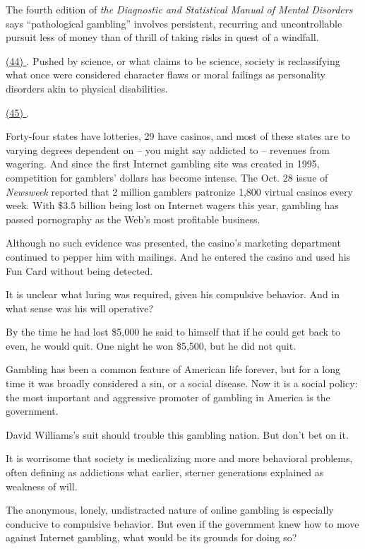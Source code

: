 \qquad The fourth edition of \emph{the Diagnostic and Statistical Manual of Mental Disorders} says ``pathological gambling'' involves persistent, recurring and uncontrollable pursuit less of money than of thrill of taking risks in quest of a windfall.

\qquad \ul{(44) \qquad\qquad}. Pushed by science, or what claims to be science, society is reclassifying what once were considered character flaws or moral failings as personality disorders akin to physical disabilities.

\qquad \ul{(45) \qquad\qquad}.

\qquad Forty-four states have lotteries, 29 have casinos, and most of these states are to varying degrees dependent on -- you might say addicted to -- revenues from wagering. And since the first Internet gambling site was created in 1995, competition for gamblers' dollars has become intense. The Oct. 28 issue of \emph{Newsweek} reported that 2 million gamblers patronize 1,800 virtual casinos every week. With \$3.5 billion being lost on Internet wagers this year, gambling has passed pornography as the Web's most profitable business.

\vspace{6pt}

\qquad [A] Although no such evidence was presented, the casino's marketing department continued to pepper him with mailings. And he entered the casino and used his Fun Card without being detected.

\qquad [B] It is unclear what luring was required, given his compulsive behavior. And in what sense was his will operative?

\qquad [C] By the time he had lost \$5,000 he said to himself that if he could get back to even, he would quit. One night he won \$5,500, but he did not quit.

\qquad [D] Gambling has been a common feature of American life forever, but for a long time it was broadly considered a sin, or a social disease. Now it is a social policy: the most important and aggressive promoter of gambling in America is the government.

\qquad [E] David Williams's suit should trouble this gambling nation. But don't bet on it.

\qquad [F] It is worrisome that society is medicalizing more and more behavioral problems, often defining as addictions what earlier, sterner generations explained as weakness of will.

\qquad [G] The anonymous, lonely, undistracted nature of online gambling is especially conducive to compulsive behavior. But even if the government knew how to move against Internet gambling, what would be its grounds for doing so?